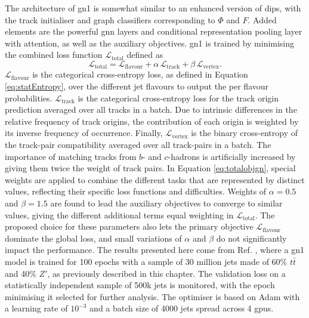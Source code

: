 The architecture of \gls{gn1} is somewhat similar to an enhanced version of \gls{dips}, with the track initialiser and graph classifiers corresponding to $\Phi$ and $F$. Added elements are the powerful \gls{gnn} layers and conditional representation pooling layer with attention, as well as the auxiliary objectives. \gls{gn1} is trained by  minimising the combined loss function $\mathcal{L}_{\textrm{total}}$ defined as 
\begin{equation}\label{eq:totalobjgn}
  \mathcal{L}_{\textrm{total}} = \mathcal{L}_{\textrm{flavour}} + \alpha \, \mathcal{L}_{\textrm{track}} + \beta \, \mathcal{L}_{\textrm{vertex}}.
\end{equation}
$\mathcal{L}_{\textrm{flavour}}$ is the categorical cross-entropy loss, as defined in Equation \ref{eq:statEntropy}, over the different jet flavours to output the per flavour probabilities. $\mathcal{L}_{\textrm{track}}$ is the categorical cross-entropy loss for the track origin prediction averaged over all tracks in a batch. Due to intrinsic differences in the relative frequency of track origins, the contribution of each origin is weighted by its inverse frequency of occurrence. Finally, $\mathcal{L}_{\textrm{vertex}}$ is the binary cross-entropy of the track-pair compatibility averaged over all track-pairs in a batch. The importance of matching tracks from $b$- and $c$-hadrons is artificially increased by giving them twice the weight of track pairs. In Equation \ref{eq:totalobjgn}, special weights are applied to combine the different tasks that are represented by distinct values, reflecting their specific loss functions and difficulties. Weights of $\alpha = 0.5$ and $\beta = 1.5$ \cite{ATL-PHYS-PUB-2022-027} are found to lead the auxiliary objectives to converge to similar values, giving the different additional terms equal weighting in $\mathcal{L}_{\textrm{total}}$. The proposed choice for these parameters also lets the primary objective $\mathcal{L}_{\textrm{flavour}}$ dominate the global loss, and small variations of $\alpha$ and $\beta$ do not significantly impact the performance. The results presented here come from Ref. \cite{ATL-PHYS-PUB-2022-027}, where a \gls{gn1} model is trained for 100 epochs with a sample of 30 million jets made of 60\% $t\bar{t}$ and 40\% $Z'$, as previously described in this chapter. The validation loss on a statistically independent sample of 500k jets is monitored, with the epoch minimising it selected for further analysis. The optimiser is based on Adam \cite{adamPaper} with a learning rate of $10^{-3}$ and a batch size of 4000 jets spread across 4 \glspl{gpu}. \\


